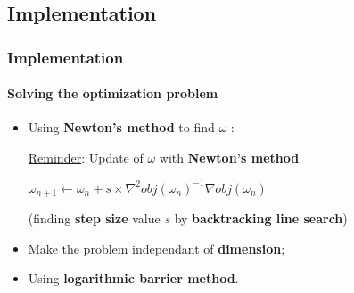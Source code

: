 \documentclass{beamer}
\begin{document}
\subsection{Implementation}

\begin{frame}
\tableofcontents[currentsubsection]
\end{frame}

\begin{frame}
\frametitle{Implementation}
\framesubtitle{Solving the optimization problem}

\begin{itemize}
\item Using \textbf{Newton's method} to find $\omega$ :

\bigskip

\begin{block}{\underline{Reminder}: Update of $\omega$ with \textbf{Newton's method}}
          \begin{center}
          $\omega_{n+1} \leftarrow \omega_{n} + s \times \nabla^2 obj(\omega_n)^{-1}\nabla obj(\omega_n)$
          \end{center}

  (finding \textbf{step size} value $s$ by \textbf{backtracking line search})
\end{block}

\pause

\item Make the problem independant of \textbf{dimension};

\pause

\item Using \textbf{logarithmic barrier method}.

\end{itemize}

\end{frame}
\end{document}
